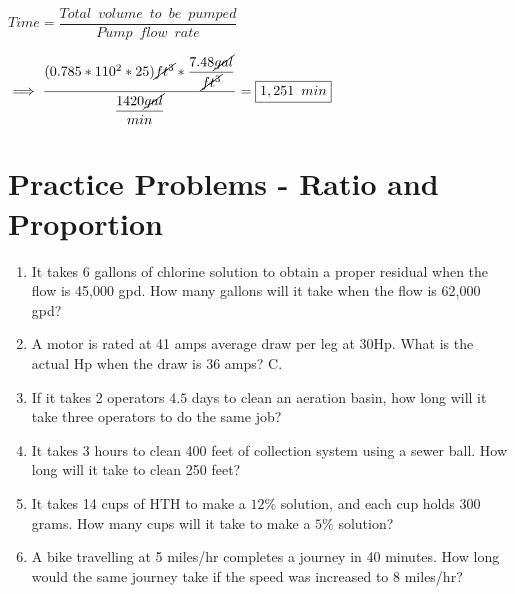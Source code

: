 \vspace{0.3cm}

$Time=\dfrac{Total \enspace volume \enspace to \enspace be \enspace pumped}{Pump \enspace flow \enspace rate}$

\vspace{0.3cm}
$\implies \dfrac{(0.785*110^2*25)\cancel{ft^3}*\dfrac{7.48\cancel{gal}}{\cancel{ft^3}}}{\dfrac{1420\cancel{gal}}{min}}= \boxed{1,251 \enspace min}$\\
\vspace{1cm}
\section*{Practice Problems - Ratio and Proportion}
\begin{enumerate}
\item It takes 6 gallons of chlorine solution to obtain a proper residual when the flow is 45,000 gpd. How many gallons will it take when the flow is 62,000 gpd?

\item A motor is rated at 41 amps average draw per leg at $30 \mathrm{Hp}$. What is the actual $\mathrm{Hp}$ when the draw is 36 amps? C. 

\item If it takes 2 operators $4.5$ days to clean an aeration basin, how long will it take three operators to do the same job?

\item It takes 3 hours to clean 400 feet of collection system using a sewer ball. How long will it take to clean 250 feet?

\item It takes 14 cups of $\mathrm{HTH}$ to make a $12 \%$ solution, and each cup holds 300 grams. How many cups will it take to make a $5 \%$ solution?

\item A bike travelling at 5 miles/hr completes a journey in 40 minutes. How long would the same journey take if the speed was increased to 8 miles/hr?
\end{enumerate}
\vspace{1cm}

